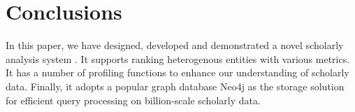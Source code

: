 \section{Conclusions}
\label{sec-conc}

In this paper, we have designed, developed and demonstrated a novel scholarly analysis system \oursystem.
It supports ranking heterogenous entities with various metrics. It has a number of profiling functions to enhance our understanding of scholarly data.
Finally, it adopts a popular graph database Neo4j as the storage solution for efficient query processing on  billion-scale scholarly data.








